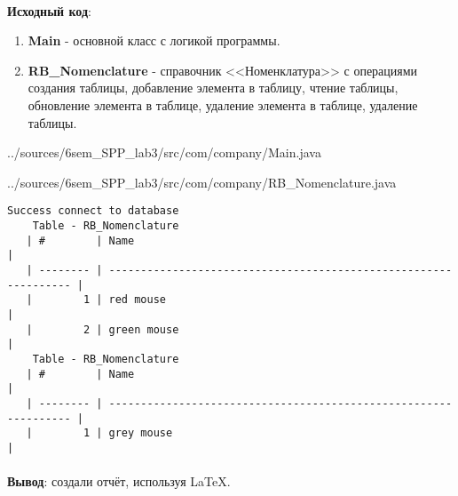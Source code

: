 \documentclass[12pt, a4paper, simple]{eskdtext}
\begin{document}
    \paragraph{} \textbf{Исходный код}: 

    \begin{enumerate}
        \item \textbf{Main} - основной класс с логикой программы.
        \item \textbf{RB\_Nomenclature} - справочник <<Номенклатура>> с операциями создания таблицы,
        добавление элемента в таблицу,
        чтение таблицы,
        обновление элемента в таблице,
        удаление элемента в таблице,
        удаление таблицы.
    \end{enumerate}

    
    {../sources/6sem_SPP_lab3/src/com/company/Main.java}

    
    {../sources/6sem_SPP_lab3/src/com/company/RB_Nomenclature.java}

    \begin{lstlisting}[name=Вывод в консоль]
    Success connect to database
    Table - RB_Nomenclature
   | #        | Name                                                             | 
   | -------- | ---------------------------------------------------------------- | 
   |        1 | red mouse                                                        | 
   |        2 | green mouse                                                      | 
    Table - RB_Nomenclature
   | #        | Name                                                             | 
   | -------- | ---------------------------------------------------------------- | 
   |        1 | grey mouse                                                       |
\end{lstlisting}

    \paragraph{} \textbf{Вывод}: создали отчёт, используя \LaTeX.

    \newpage
\end{document}
